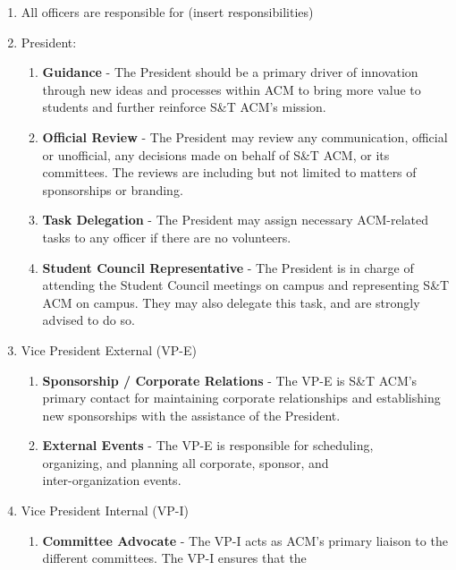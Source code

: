     \begin{enumerate}[label=\arabic*.]
      \item All officers are responsible for (insert responsibilities)
      \item President:
        \begin{enumerate}[label=\alph*.]
          \item \textbf{Guidance} - The President should be a primary driver of
            innovation through new ideas and processes within ACM to bring more
            value to students and further reinforce S\&T ACM's mission.
          \item \textbf{Official Review} - The President may review any
          communication, official or unofficial, any decisions made on behalf of
          S\&T ACM, or its committees. The reviews are including but not limited
          to matters of sponsorships or branding.
          \item \textbf{Task Delegation} - The President may assign necessary
            ACM-related tasks to any officer if there are no volunteers.
          \item \textbf{Student Council Representative} - The President is in charge of
          attending the Student Council meetings on campus and representing S\&T
          ACM on campus. They may also delegate this task, and are strongly
          advised to do so.
        \end{enumerate}
      \item Vice President External (VP-E)
        \begin{enumerate}[label=\alph*.]
          \item \textbf{Sponsorship / Corporate Relations} - The VP-E is S\&T ACM's
            primary contact for maintaining corporate relationships and
            establishing new sponsorships with the assistance of the President.
          \item \textbf{External Events} - The VP-E is responsible for
            scheduling,\\ organizing, and planning all corporate, sponsor, and\\
            inter-organization events.
        \end{enumerate}
      \item Vice President Internal (VP-I)
        \begin{enumerate}[label=\alph*.]
          \item \textbf{Committee Advocate} - The VP-I acts as ACM's primary
            liaison to the different committees. The VP-I ensures that the

\end{enumerate}
\end{enumerate}
